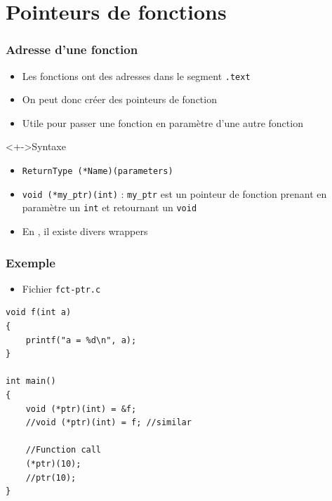 \section{Pointeurs de fonctions}

\begin{frame}
\frametitle{Adresse d'une fonction}
\begin{itemize}[<+->]
\item Les fonctions ont des adresses dans le segment \texttt{.text}
\item On peut donc créer des pointeurs de fonction
\item Utile pour passer une fonction en paramètre d'une autre fonction
\end{itemize}
\begin{exampleblock}<+->{Syntaxe}
	\begin{itemize}[<+->]
	\item \texttt{ReturnType (*Name)(parameters)}
	\item \lstinline|void (*my_ptr)(int)| : \texttt{my\_ptr} est un pointeur de fonction prenant en paramètre un \lstinline|int| et retournant un \lstinline|void|
	\end{itemize}
\end{exampleblock}
\begin{itemize}[<+->]
\item En \cpp, il existe divers wrappers
\end{itemize}
\end{frame}

\begin{frame}[containsverbatim]
\frametitle{Exemple}
\begin{itemize}
\item Fichier \texttt{fct-ptr.c}
\end{itemize}
\begin{lstlisting}
void f(int a) 
{ 
	printf("a = %d\n", a); 
} 

int main() 
{ 
	void (*ptr)(int) = &f;
	//void (*ptr)(int) = f; //similar	

	//Function call
	(*ptr)(10); 
	//ptr(10);
} 
\end{lstlisting}
\end{frame}

